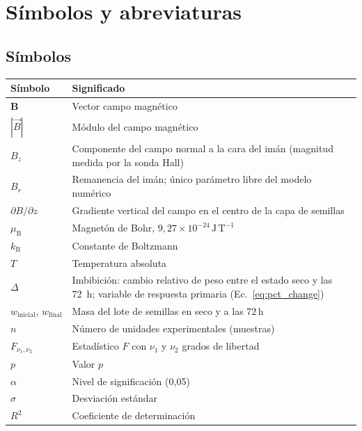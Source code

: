 \clearpage
\chapter*{Símbolos y abreviaturas}

\section*{Símbolos}

\small
\renewcommand{\arraystretch}{0.88}
\begin{longtable}{@{}p{}p{}@{}}
\toprule
Símbolo & Significado \\
\midrule
\endhead
\(\bm{B}\)                 & Vector campo magnético \\
\(|\vec{B}|\)              & Módulo del campo magnético \\
\(B_z\)                    & Componente del campo normal a la cara del imán (magnitud medida por la sonda Hall) \\
\(B_r\)                    & Remanencia del imán; único parámetro libre del modelo numérico \\
\(\partial B/\partial z\)  & Gradiente vertical del campo en el centro de la capa de semillas \\
\(\mu_{\mathrm B}\)        & Magnetón de Bohr, \(9{,}27\times10^{-24}\,\mathrm{J\,T^{-1}}\) \\
\(k_{\mathrm B}\)          & Constante de Boltzmann \\
\(T\)                      & Temperatura absoluta \\
\(\Delta\)                 & Imbibición: cambio relativo de peso entre el estado seco y las 72~h; variable de respuesta primaria (Ec.~\ref{eq:pct_change}) \\
\(w_{\text{inicial}},\,w_{\text{final}}\) & Masa del lote de semillas en seco y a las 72\,h \\
\(n\)                      & Número de unidades experimentales (muestras) \\
\(F_{\nu_1,\nu_2}\)        & Estadístico \(F\) con \(\nu_1\) y \(\nu_2\) grados de libertad \\
\(p\)                      & Valor \(p\) \\
\(\alpha\)                 & Nivel de significación (0,05) \\
\(\sigma\)                 & Desviación estándar \\
\(R^{2}\)                  & Coeficiente de determinación \\
\bottomrule
\end{longtable}

